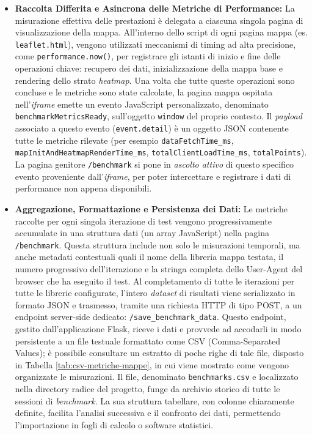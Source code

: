 \begin{itemize}[leftmargin=*]
    \item \textbf{Raccolta Differita e Asincrona delle Metriche di Performance:}
    La misurazione effettiva delle prestazioni è delegata a ciascuna singola pagina di visualizzazione della mappa. All'interno dello script di ogni pagina mappa (es. \texttt{leaflet.html}), vengono utilizzati meccanismi di timing ad alta precisione, come \texttt{performance.now()}, per registrare gli istanti di inizio e fine delle operazioni chiave: recupero dei dati, inizializzazione della mappa base e rendering dello strato \textit{heatmap}.
    Una volta che tutte queste operazioni sono concluse e le metriche sono state calcolate, la pagina mappa ospitata nell'\textit{iframe} emette un evento JavaScript personalizzato, denominato \texttt{benchmarkMetricsReady}, sull'oggetto \texttt{window} del proprio contesto. Il \textit{payload} associato a questo evento (\texttt{event.detail}) è un oggetto JSON contenente tutte le metriche rilevate (per esempio \texttt{dataFetchTime\_ms}, \texttt{mapInitAndHeatmapRenderTime\_ms}, \texttt{totalClientLoadTime\_ms}, \texttt{totalPoints}). La pagina genitore \texttt{/benchmark} si pone in \textit{ascolto attivo} di questo specifico evento proveniente dall'\textit{iframe}, per poter intercettare e registrare i dati di performance non appena disponibili.

    \item \textbf{Aggregazione, Formattazione e Persistenza dei Dati:}
    Le metriche raccolte per ogni singola iterazione di test vengono progressivamente accumulate in una struttura dati (un array JavaScript) nella pagina \texttt{/benchmark}. Questa struttura include non solo le misurazioni temporali, ma anche metadati contestuali quali il nome della libreria mappa testata, il numero progressivo dell'iterazione e la stringa completa dello User-Agent del browser che ha eseguito il test.
    Al completamento di tutte le iterazioni per tutte le librerie configurate, l'intero \textit{dataset} di risultati viene serializzato in formato JSON e trasmesso, tramite una richiesta HTTP di tipo POST, a un endpoint server-side dedicato: \texttt{/save\_benchmark\_data}. Questo endpoint, gestito dall'applicazione Flask, riceve i dati e provvede ad accodarli in modo persistente a un file testuale formattato come CSV (Comma-Separated Values); è possibile consultare un estratto di poche righe di tale file, disposto in Tabella \ref{tab:csv-metriche-mappe}, in cui viene mostrato come vengono organizzate le misurazioni. Il file, denominato \texttt{benchmarks.csv} e localizzato nella directory radice del progetto, funge da archivio storico di tutte le sessioni di \textit{benchmark}. La sua struttura tabellare, con colonne chiaramente definite, facilita l'analisi successiva e il confronto dei dati, permettendo l'importazione in fogli di calcolo o software statistici.
        
\end{itemize}

